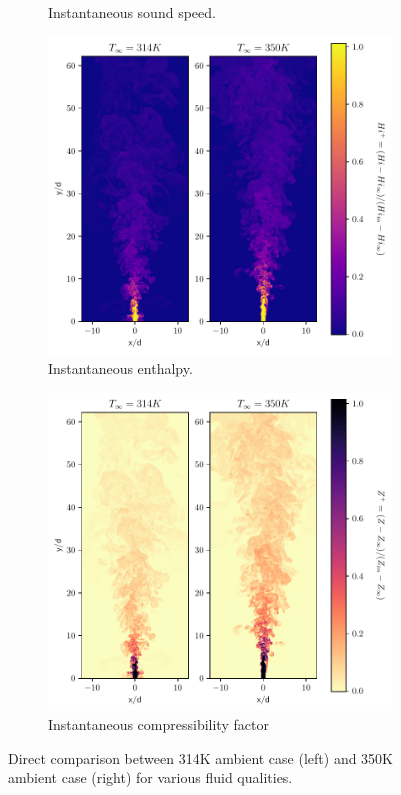 \begin{figure}[H]
\begin{subfigure}{0.5\textwidth}
	\caption{Instantaneous sound speed.} \label{noniso_Cs_1}
\end{subfigure}
\vfill
\begin{subfigure}{0.5\textwidth}
	\centering
	\includegraphics[scale=.45]{figures/Plots/vertical/Hi_scaled_vert_noniso.pdf}
	\caption{Instantaneous enthalpy.} \label{noniso_Hi_1}
\end{subfigure}
\hfill
\begin{subfigure}{0.5\textwidth}
	\centering
	\includegraphics[scale=.45]{figures/Plots/vertical/Z_scaled_vert_noniso.pdf}
	\caption{Instantaneous compressibility factor} \label{noniso_Z_1}
\end{subfigure}
\caption{Direct comparison between 314K ambient case (left) and 350K ambient case (right) for various fluid qualities.}
\label{noniso_various_features}
\end{figure}

